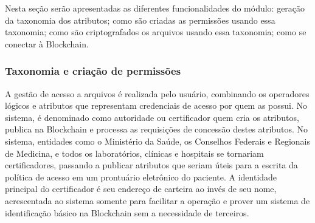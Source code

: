 \documentclass[a4paper,11pt]{article}
\begin{document}
Nesta seção serão apresentadas as diferentes funcionalidades do módulo: geração da taxonomia dos atributos; como são criadas as permissões usando essa taxonomia; como são criptografados os arquivos usando essa taxonomia; como se conectar à Blockchain.

\subsubsection{Taxonomia e criação de permissões}
\label{sec:sub:taxonomia-permissoes}

A gestão de acesso a arquivos é realizada pelo usuário, combinando os operadores lógicos e atributos que representam credenciais de acesso por quem as possui.
No sistema, é denominado como autoridade ou certificador quem cria os atributos, publica na Blockchain e processa as requisições de concessão destes atributos.
No sistema, entidades como o Ministério da Saúde, os Conselhos Federais e Regionais de Medicina, e todos os laboratórios, clínicas e hospitais se tornariam certificadores, passando a publicar atributos que seriam úteis para a escrita da política de acesso em um prontuário eletrônico do paciente.
A identidade principal do certificador é seu endereço de carteira ao invés de seu nome, acrescentada ao sistema somente para facilitar a operação e prover um sistema de identificação básico na Blockchain sem a necessidade de terceiros. %

\end{document}
